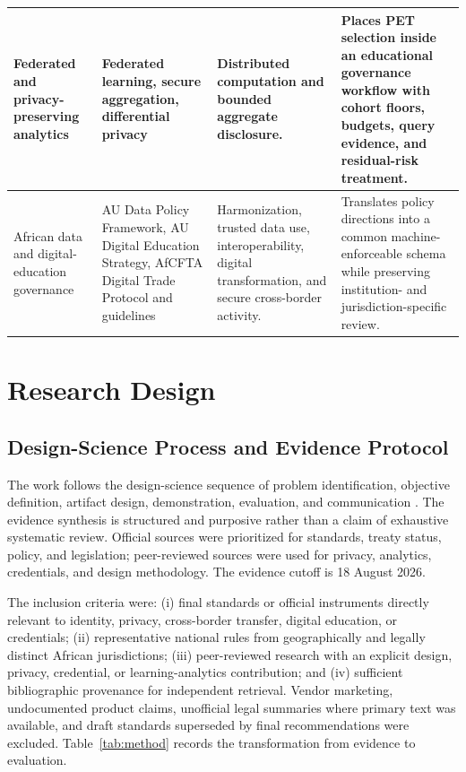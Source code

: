 \documentclass[journal]{IEEEtran}
\newcommand{\papercutoff}{18 August 2026}
\begin{document}
\begin{table}[t]
\begin{tabularx}{\textwidth}{|p{}|p{}|p{}|p{}|}
\hline
Federated and privacy-preserving analytics & Federated learning, secure aggregation, differential privacy \cite{McMahan2017FL,Bonawitz2017SecureAgg,Dwork2006DP,gabrielli2022} & Distributed computation and bounded aggregate disclosure. & Places PET selection inside an educational governance workflow with cohort floors, budgets, query evidence, and residual-risk treatment. \\
\hline
African data and digital-education governance & AU Data Policy Framework, AU Digital Education Strategy, AfCFTA Digital Trade Protocol and guidelines \cite{audatapolicy,audigitaleducation,AfCFTADigitalTrade2024,audigitaltradeguidelines} & Harmonization, trusted data use, interoperability, digital transformation, and secure cross-border activity. & Translates policy directions into a common machine-enforceable schema while preserving institution- and jurisdiction-specific review. \\
\hline
\end{tabularx}
\end{table}

\section{Research Design}
\subsection{Design-Science Process and Evidence Protocol}
The work follows the design-science sequence of problem identification, objective definition, artifact design, demonstration, evaluation, and communication \cite{peffers2007}. The evidence synthesis is structured and purposive rather than a claim of exhaustive systematic review. Official sources were prioritized for standards, treaty status, policy, and legislation; peer-reviewed sources were used for privacy, analytics, credentials, and design methodology. The evidence cutoff is \papercutoff.

The inclusion criteria were: (i) final standards or official instruments directly relevant to identity, privacy, cross-border transfer, digital education, or credentials; (ii) representative national rules from geographically and legally distinct African jurisdictions; (iii) peer-reviewed research with an explicit design, privacy, credential, or learning-analytics contribution; and (iv) sufficient bibliographic provenance for independent retrieval. Vendor marketing, undocumented product claims, unofficial legal summaries where primary text was available, and draft standards superseded by final recommendations were excluded. Table~\ref{tab:method} records the transformation from evidence to evaluation.
\end{document}
